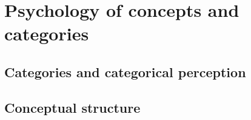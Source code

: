 \chapter{Psychology of concepts and categories}
\label{chap:concepts_categories}

\section{Categories and categorical perception}

\section{Conceptual structure}
